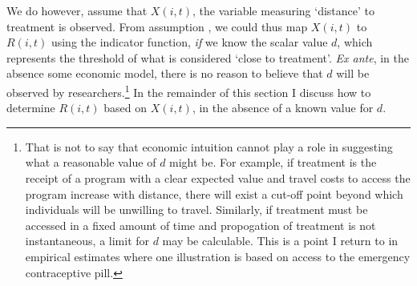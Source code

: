 We do however, assume that $X(i,t)$, the variable measuring `distance' to 
treatment is observed. From assumption , we could thus map 
$X(i,t)$ to $R(i,t)$ using the indicator function, \emph{if} we know the scalar 
value $d$, which represents the threshold of what is considered `close to 
treatment'. \emph{Ex ante}, in the absence some economic model, there is no 
reason to believe that $d$ will be observed by researchers.\footnote{That is not 
to say that economic intuition cannot play a role in suggesting what a reasonable 
value of $d$ might be. For example, if treatment is the receipt of a program with 
a clear expected value and travel costs to access the program increase with 
distance, there will exist a cut-off point beyond which individuals will be 
unwilling to travel. Similarly, if treatment must be accessed in a fixed amount 
of time and propogation of treatment is not instantaneous, a limit for $d$ may be 
calculable. This is a point I return to in empirical estimates where one 
illustration is based on access to the emergency contraceptive pill.}  In the 
remainder of this section I discuss how to determine $R(i,t)$ based on $X(i,t)$, 
in the absence of a known value for $d$.

